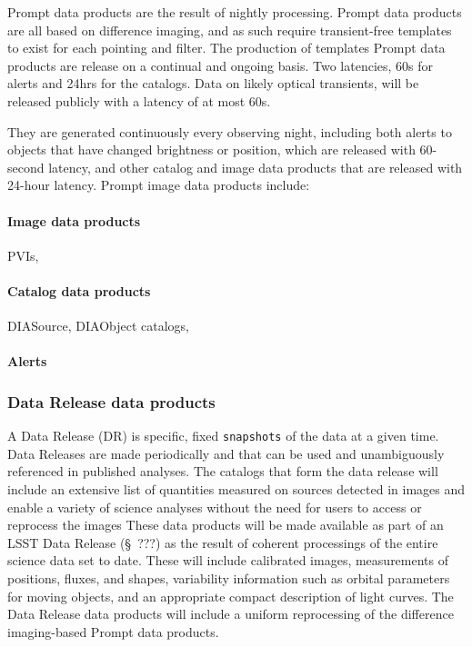 Prompt data products are the result of nightly processing.
Prompt data products are all based on difference imaging, and as such require transient-free templates to  exist for each pointing and filter. The production of templates
Prompt data products are release on a continual and ongoing basis.
Two latencies, 60s for alerts and 24hrs for the catalogs. Data on likely optical transients, will be released publicly with a latency of at most 60s.

They are generated continuously every observing night, including both alerts to objects that have changed brightness or position,
which are released with 60-second latency,
and other catalog and image data products that are released with 24-hour latency.
Prompt image data products include:
\paragraph {Image data products}  PVIs,
\paragraph {Catalog data products}  DIASource, DIAObject catalogs,
\paragraph {Alerts}


\subsubsection{Data Release data products} \label{sec:dp-release}
A Data Release (DR) is specific, fixed {\tt snapshots} of the data at a given time.
Data Releases are made periodically and that can be used and
unambiguously referenced in published analyses.
The catalogs that form the data release will include an extensive list of quantities measured on sources detected in images and
enable a variety of science analyses without the need for users to access or reprocess the images
These data products will be made available as part of an LSST Data Release (\S~???) as the result of coherent
processings of the entire science data set to date.
These will include calibrated images, measurements of positions, fluxes, and shapes,  variability information such as orbital
parameters for moving objects, and an appropriate compact description of light curves.
The Data Release data products will include a uniform reprocessing of the difference imaging-based Prompt data products.

